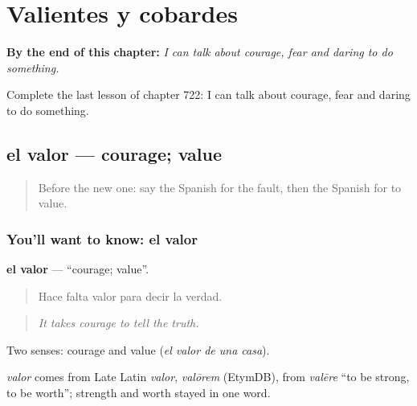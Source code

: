 
\chapter{Valientes y cobardes}
\label{ch:es-valientes-y-cobardes}

\begin{chapteropening}
\textbf{By the end of this chapter:} \emph{I can talk about courage, fear and daring to do something.}

Complete the last lesson of chapter 722: I can talk about courage, fear and daring to do something.
\end{chapteropening}

\section[el valor]{el valor — courage; value}

\label{lesson:ES-C722-valor}



\begin{quote}
Before the new one: say the Spanish for the fault, then the Spanish for to value.
\end{quote}

\subsection*{You'll want to know: el valor}
\textbf{el valor} — \textquotedblleft{}courage; value\textquotedblright{}.

\begin{quote}
Hace falta valor para decir la verdad.
\end{quote}

\begin{quote}
\emph{It takes courage to tell the truth.}
\end{quote}

Two senses: courage and value (\emph{el valor de una casa}).

\begin{cousinweb}
\emph{valor} comes from Late Latin \emph{valor}, \emph{valōrem} (EtymDB), from \emph{valēre} \textquotedblleft{}to be strong, to be worth\textquotedblright{}; strength and worth stayed in one word.
\end{cousinweb}

